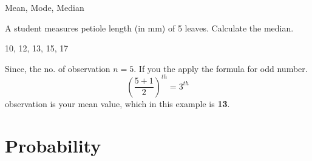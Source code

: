 \documentclass{beamer}
\begin{document}
\begin{frame}{Mean, Mode, Median}   
    \begin{example}
    A student measures petiole length (in mm) of 5 leaves. Calculate the median.
    \begin{center}
        10, 12, 13, 15, 17
    \end{center}
        Since, the no. of observation $n= 5$. If you the apply the formula for odd number.
        \begin{equation}
            (\frac{5+1}{2})^{th}= 3^{th}
        \end{equation}
        observation is your mean value, which in this example is \textbf{13}.
    \end{example}
    \begin{example}

    \end{example}
\end{frame}


\section{Probability}
\end{document}
